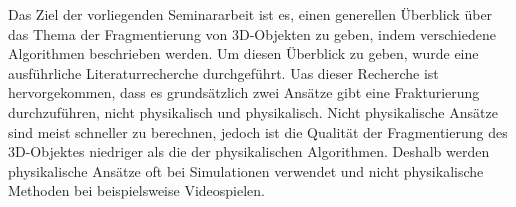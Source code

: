 Das Ziel der vorliegenden Seminararbeit ist es, einen generellen Überblick über das Thema der Fragmentierung von 3D-Objekten zu geben, indem verschiedene Algorithmen
beschrieben werden. Um diesen Überblick zu geben, wurde eine ausführliche Literaturrecherche durchgeführt. Uas dieser Recherche ist hervorgekommen, dass es 
grundsätzlich zwei Ansätze gibt eine Frakturierung durchzuführen, nicht physikalisch und physikalisch. Nicht physikalische Ansätze sind meist schneller zu berechnen,
jedoch ist die Qualität der Fragmentierung des 3D-Objektes niedriger als die der physikalischen Algorithmen. Deshalb werden physikalische Ansätze oft bei Simulationen verwendet
und nicht physikalische Methoden bei beispielsweise Videospielen.
